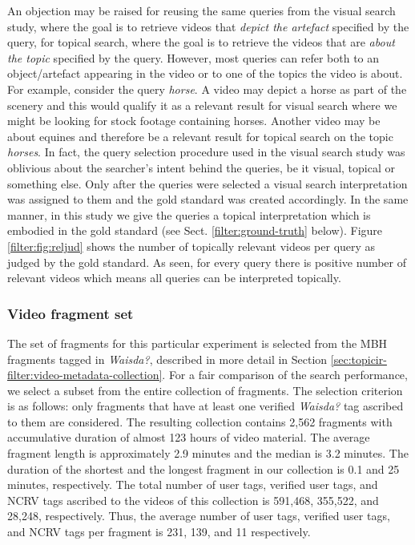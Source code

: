 An objection may be raised for reusing the same queries from the visual search study, where the goal is to retrieve videos that \textit{depict the artefact} specified by the query, for topical search, where the goal is to retrieve the videos that are \textit{about the topic} specified by the query. However, most queries can refer both to an object/artefact appearing in the video or to one of the topics the video is about. For example, consider the query \textit{horse}. A video may depict a horse as part of the scenery and this would qualify it as a relevant result for visual search where we might be looking for stock footage containing horses.  Another video may be about equines and therefore be a relevant result for topical search on the topic \textit{horses}.
In fact, the query selection procedure used in the visual search study \cite{ecir} was oblivious about the searcher's intent behind the queries, be it visual, topical or something else. Only after the queries were selected a visual search interpretation was assigned to them and the gold standard was created accordingly. In the same manner, in this study we give the queries a topical interpretation which is embodied in the gold standard (see Sect. \ref{filter:ground-truth} below). Figure \ref{filter:fig:reljud} shows the number of topically relevant videos per query as judged by the gold standard. As seen, for every query there is positive number of relevant videos which means all queries can be interpreted topically.

\subsubsection{Video fragment set}
The set of fragments for this particular experiment is selected from the MBH fragments tagged in \textit{Waisda?}, described in more detail in Section \ref{sec:topicir-filter:video-metadata-collection}. For a fair comparison of the search performance, we select a subset from the entire collection of fragments. The selection criterion is as follows: only fragments that have at least one verified \textit{Waisda?} tag ascribed to them are considered. The resulting collection contains 2,562 fragments with accumulative duration of almost 123 hours of video material.
The average fragment length is approximately 2.9 minutes and the median is 3.2 minutes. The duration of the shortest and the longest fragment in our collection is 0.1 and 25 minutes, respectively. The total number of user tags, verified user tags, and NCRV tags ascribed to the videos of this collection is 591,468, 355,522, and 28,248, respectively. Thus, the average number of user tags, verified user tags, and NCRV tags per fragment is 231, 139, and 11 respectively.


